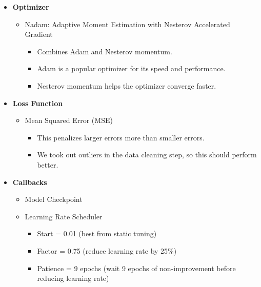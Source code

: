 \documentclass[11pt]{article}
\providecommand{\tightlist}{%
      \setlength{\itemsep}{0pt}\setlength{\parskip}{0pt}}
\begin{document}
\begin{itemize}
\tightlist
\item
  \textbf{Optimizer}

  \begin{itemize}
  \tightlist
  \item
    Nadam: Adaptive Moment Estimation with Nesterov Accelerated Gradient

    \begin{itemize}
    \tightlist
    \item
      Combines Adam and Nesterov momentum.
    \item
      Adam is a popular optimizer for its speed and performance.
    \item
      Nesterov momentum helps the optimizer converge faster.
    \end{itemize}
  \end{itemize}
\item
  \textbf{Loss Function}

  \begin{itemize}
  \tightlist
  \item
    Mean Squared Error (MSE)

    \begin{itemize}
    \tightlist
    \item
      This penalizes larger errors more than smaller errors.
    \item
      We took out outliers in the data cleaning step, so this should
      perform better.
    \end{itemize}
  \end{itemize}
\item
  \textbf{Callbacks}

  \begin{itemize}
  \tightlist
  \item
    Model Checkpoint
  \item
    Learning Rate Scheduler

    \begin{itemize}
    \tightlist
    \item
      Start = 0.01 (best from static tuning)
    \item
      Factor = 0.75 (reduce learning rate by 25\%)
    \item
      Patience = 9 epochs (wait 9 epochs of non-improvement before
      reducing learning rate)
    \end{itemize}
  \end{itemize}
\end{itemize}
\end{document}
